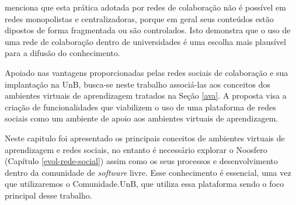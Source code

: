  menciona que esta prática adotada por redes de colaboração não é possível em redes monopolistas e centralizadoras, porque em geral seus conteúdos estão dipostos de forma fragmentada ou são controlados. Isto demonstra que o uso de uma rede de colaboração dentro de universidades é uma escolha mais plausível para a difusão do conhecimento.

Apoiado nas vantagens proporcionadas pelas redes sociais de colaboração e sua implantação na UnB, busca-se neste trabalho associá-las aos conceitos dos ambientes virtuais de aprendizagem tratados na Seção \ref{ava}. A proposta visa a criação de funcionalidades que viabilizem o uso de uma plataforma de redes sociais como um ambiente de apoio aos ambientes virtuais de aprendizagem.

Neste capitulo foi apresentado os principais conceitos de ambientes virtuais de aprendizagem e redes sociais, no entanto é necessário explorar o Noosfero (Capítulo \ref{evol-rede-social}) assim como os seus processos e desenvolvimento dentro da comunidade de \textit{software} livre. Esse conhecimento é essencial, uma vez que utilizaremos o Comunidade.UnB, que utiliza essa plataforma sendo o foco principal desse trabalho.
